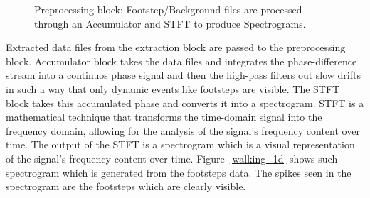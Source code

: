 \begin{figure}[ht]
  \centering
  \caption{Preprocessing block: Footstep/Background files are processed through an Accumulator and STFT to produce Spectrograms.}
  \label{fig:Preprocessing_block}
\end{figure}

Extracted data files from the extraction block are passed to the preprocessing block. Accumulator block takes the data files and integrates the phase-difference stream into a continuos phase signal and then the high-pass filters out slow drifts in such a way that only dynamic events like footsteps are visible. The STFT block takes this accumulated phase and converts it into a spectrogram. STFT is a mathematical technique that transforms the time-domain signal into the frequency domain, allowing for the analysis of the signal's frequency content over time. The output of the STFT is a spectrogram which is a visual representation of the signal's frequency content over time. Figure~\ref{walking_1d} shows such spectrogram which is generated from the footsteps data. The spikes seen in the spectrogram are the footsteps which are clearly visible. 


